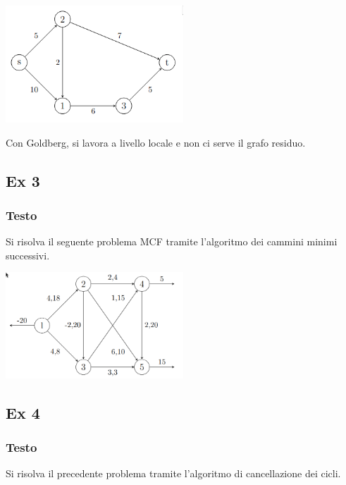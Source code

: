 \begin{center}
  \includegraphics[width=0.5\textwidth]{img/2025-04-07-19-57-28.png}
\end{center}

Con Goldberg, si lavora a livello locale e non ci serve il grafo residuo. 

\subsection{Ex 3}

\subsubsection{Testo}
Si risolva il seguente problema MCF tramite l’algoritmo dei cammini minimi successivi.
\begin{center}
  \includegraphics[width=0.5\textwidth]{img/2025-04-07-10-27-08.png}
\end{center}

\subsection{Ex 4}
\subsubsection{Testo}
Si risolva il precedente problema tramite l’algoritmo di cancellazione dei cicli.

% 
